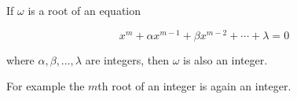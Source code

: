 If $\omega$ is a root of an equation

$$x^m + \alpha x^{m-1} + \beta x^{m-2} + \cdots + \lambda = 0$$

where $\alpha, \beta, \ldots, \lambda$ are integers, then $\omega$ is also an integer.

For example the $m$th root of an integer is again an integer.
